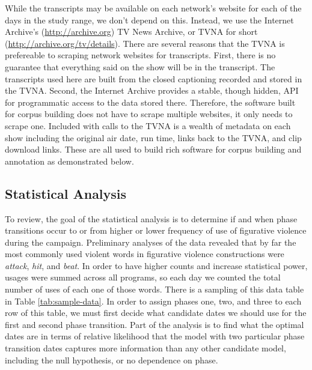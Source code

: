 While the transcripts may be available on each network's website 
for each of the days in the study range, we don't depend on this.
Instead, we use the Internet Archive's (\url{http://archive.org}) 
TV News Archive, or TVNA for short (\url{http://archive.org/tv/details}).
There are several reasons that the TVNA is prefereable to scraping network
websites for transcripts.
First, there is no guarantee that everything said on the show
will be in the transcript. The transcripts used here are built from the
closed captioning recorded and stored in the TVNA. 
Second, the Internet Archive provides a stable, though hidden, API for 
programmatic access to the data stored there. Therefore, the software built
for corpus building does not have to scrape multiple websites, it only needs to
scrape one. Included with calls to the TVNA is a wealth of metadata on each
show including the original air date, run time, links back to the TVNA, and
clip download links. These are all used to build rich software for corpus
building and annotation as demonstrated below.


\subsection{Statistical Analysis}
\label{sub:statistical-analysis}

To review, the goal of the statistical analysis is to determine if and when
phase transitions occur to or from higher or lower frequency of use 
of figurative violence
during the campaign. Preliminary analyses of the data revealed that by far
the most commonly used violent words in figurative violence constructions were
\textit{attack}, \textit{hit}, and \textit{beat}. In order to have higher 
counts and increase statistical power, usages were summed across all programs,
so each day we counted the total number of uses of each one of those words.
There is a sampling of this data table in Table \ref{tab:sample-data}. In 
order to assign phases one, two, and three to each row of this table, we
must first decide what candidate dates we should use for the first and
second phase transition. Part of the analysis is to find what the optimal 
dates are in terms of relative likelihood that the model with two particular
phase transition dates captures more information than any other candidate
model, including the null hypothesis, or no dependence on phase.

